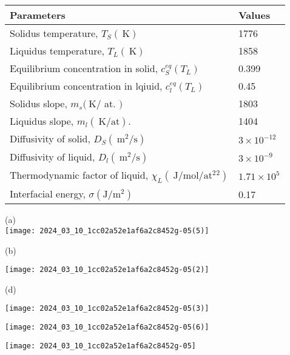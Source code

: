 \documentclass[10pt]{article}
\begin{document}
\begin{center}
\begin{tabular}{ll}
\hline
Parameters & Values \\
\hline
Solidus temperature, $T_{S}(\mathrm{~K})$ & 1776 \\
Liquidus temperature, $T_{L}(\mathrm{~K})$ & 1858 \\
Equilibrium concentration in solid, $c_{S}^{e q}\left(T_{L}\right)$ & 0.399 \\
Equilibrium concentration in lqiuid, $c_{l}^{e q}\left(T_{L}\right)$ & 0.45 \\
Solidus slope, $m_{s}(\mathrm{~K} /$ at. $)$ & 1803 \\
Liquidus slope, $m_{l}(\mathrm{~K} / \mathrm{at})$. & 1404 \\
Diffusivity of solid, $D_{S}\left(\mathrm{~m}^{2} / \mathrm{s}\right)$ & $3 \times 10^{-12}$ \\
Diffusivity of liquid, $D_{l}\left(\mathrm{~m}^{2} / \mathrm{s}\right)$ & $3 \times 10^{-9}$ \\
Thermodynamic factor of liquid, $\chi_{L}\left(\mathrm{~J} / \mathrm{mol} / \mathrm{at}^{2}{ }^{2}\right)$ & $1.71 \times 10^{5}$ \\
Interfacial energy, $\sigma\left(\mathrm{J} / \mathrm{m}^{2}\right)$ & 0.17 \\
\hline
\end{tabular}
\end{center}

(a)\\
\texttt{[image: 2024\_03\_10\_1cc02a52e1af6a2c8452g-05(5)]}

(b)

\begin{center}
\texttt{[image: 2024\_03\_10\_1cc02a52e1af6a2c8452g-05(2)]}
\end{center}

(d)

\begin{center}
\texttt{[image: 2024\_03\_10\_1cc02a52e1af6a2c8452g-05(3)]}
\end{center}

\begin{center}
\texttt{[image: 2024\_03\_10\_1cc02a52e1af6a2c8452g-05(6)]}
\end{center}

\begin{center}
\texttt{[image: 2024\_03\_10\_1cc02a52e1af6a2c8452g-05]}
\end{center}
\end{document}
